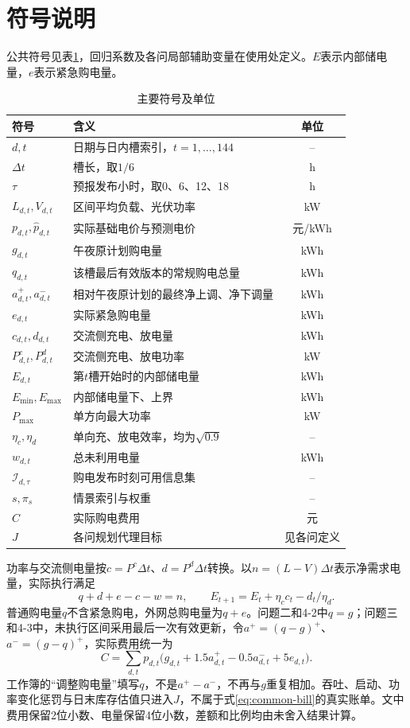\section{符号说明}
公共符号见表\ref{tab:global-symbols}，回归系数及各问局部辅助变量在使用处定义。$E$表示内部储电量，$e$表示紧急购电量。
\begin{table}[H]\centering
\caption{主要符号及单位}\label{tab:global-symbols}
\renewcommand{\arraystretch}{1.1}
\begin{tabularx}{\textwidth}{p{3.1cm}Xc}\toprule
符号 & 含义 & 单位\\\midrule
$d,t$ & 日期与日内槽索引，$t=1,\ldots,144$ & --\\
$\Delta t$ & 槽长，取$1/6$ & h\\
$\tau$ & 预报发布小时，取0、6、12、18 & h\\
$L_{d,t},V_{d,t}$ & 区间平均负载、光伏功率 & kW\\
$p_{d,t},\widehat p_{d,t}$ & 实际基础电价与预测电价 & 元/kWh\\
$g_{d,t}$ & 午夜原计划购电量 & kWh\\
$q_{d,t}$ & 该槽最后有效版本的常规购电总量 & kWh\\
$a^+_{d,t},a^-_{d,t}$ & 相对午夜原计划的最终净上调、净下调量 & kWh\\
$e_{d,t}$ & 实际紧急购电量 & kWh\\
$c_{d,t},d_{d,t}$ & 交流侧充电、放电量 & kWh\\
$P^c_{d,t},P^d_{d,t}$ & 交流侧充电、放电功率 & kW\\
$E_{d,t}$ & 第$t$槽开始时的内部储电量 & kWh\\
$E_{\min},E_{\max}$ & 内部储电量下、上界 & kWh\\
$P_{\max}$ & 单方向最大功率 & kW\\
$\eta_c,\eta_d$ & 单向充、放电效率，均为$\sqrt{0.9}$ & --\\
$w_{d,t}$ & 总未利用电量 & kWh\\
$\mathcal I_{d,\tau}$ & 购电发布时刻可用信息集 & --\\
$s,\pi_s$ & 情景索引与权重 & --\\
$C$ & 实际购电费用 & 元\\
$J$ & 各问规划代理目标 & 见各问定义\\\bottomrule
\end{tabularx}\end{table}
功率与交流侧电量按$c=P^c\Delta t$、$d=P^d\Delta t$转换。以$n=(L-V)\Delta t$表示净需求电量，实际执行满足
\begin{equation}\label{eq:common-balance}
 q+d+e-c-w=n,\qquad E_{t+1}=E_t+\eta_c c_t-d_t/\eta_d.
\end{equation}
普通购电量$q$不含紧急购电，外网总购电量为$q+e$。问题二和4-2中$q=g$；问题三和4-3中，未执行区间采用最后一次有效更新，令$a^+=(q-g)^+$、$a^-=(g-q)^+$，实际费用统一为
\begin{equation}\label{eq:common-bill}
 C=\sum_{d,t}p_{d,t}\bigl(g_{d,t}+1.5a^+_{d,t}-0.5a^-_{d,t}+5e_{d,t}\bigr).
\end{equation}
工作簿的“调整购电量”填写$q$，不是$a^+-a^-$，不再与$g$重复相加。吞吐、启动、功率变化惩罚与日末库存估值只进入$J$，不属于式\eqref{eq:common-bill}的真实账单。文中费用保留2位小数、电量保留4位小数，差额和比例均由未舍入结果计算。
